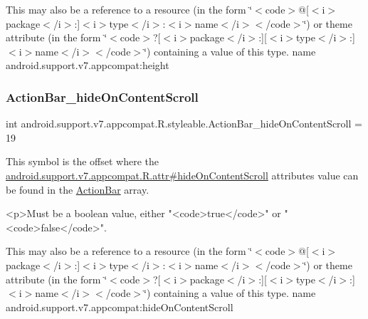 This may also be a reference to a resource (in the form \char`\"{}$<$code$>$@\mbox{[}$<$i$>$package$<$/i$>$\+:\mbox{]}$<$i$>$type$<$/i$>$\+:$<$i$>$name$<$/i$>$$<$/code$>$\char`\"{}) or theme attribute (in the form \char`\"{}$<$code$>$?\mbox{[}$<$i$>$package$<$/i$>$\+:\mbox{]}\mbox{[}$<$i$>$type$<$/i$>$\+:\mbox{]}$<$i$>$name$<$/i$>$$<$/code$>$\char`\"{}) containing a value of this type.  name android.\+support.\+v7.\+appcompat\+:height \mbox{\label{classandroid_1_1support_1_1v7_1_1appcompat_1_1R_1_1styleable_ac03598addae3e6fc7d42a661b99b2572}} 
\subsubsection{\texorpdfstring{Action\+Bar\+\_\+hide\+On\+Content\+Scroll}{ActionBar\_hideOnContentScroll}}
{\footnotesize\ttfamily int android.\+support.\+v7.\+appcompat.\+R.\+styleable.\+Action\+Bar\+\_\+hide\+On\+Content\+Scroll = 19\hspace{0.3cm}{\ttfamily [static]}}

This symbol is the offset where the \hyperlink{classandroid_1_1support_1_1v7_1_1appcompat_1_1R_1_1attr_acd8f7a0451e3e9f87d4b5637d3adcf2f}{android.\+support.\+v7.\+appcompat.\+R.\+attr\#hide\+On\+Content\+Scroll} attribute\textquotesingle{}s value can be found in the \hyperlink{classandroid_1_1support_1_1v7_1_1appcompat_1_1R_1_1styleable_a5941dc15714398e9ec9afaa0155cc1cf}{Action\+Bar} array.

\begin{DoxyVerb}      <p>Must be a boolean value, either "<code>true</code>" or "<code>false</code>".
\end{DoxyVerb}
 

This may also be a reference to a resource (in the form \char`\"{}$<$code$>$@\mbox{[}$<$i$>$package$<$/i$>$\+:\mbox{]}$<$i$>$type$<$/i$>$\+:$<$i$>$name$<$/i$>$$<$/code$>$\char`\"{}) or theme attribute (in the form \char`\"{}$<$code$>$?\mbox{[}$<$i$>$package$<$/i$>$\+:\mbox{]}\mbox{[}$<$i$>$type$<$/i$>$\+:\mbox{]}$<$i$>$name$<$/i$>$$<$/code$>$\char`\"{}) containing a value of this type.  name android.\+support.\+v7.\+appcompat\+:hide\+On\+Content\+Scroll \mbox{\label{classandroid_1_1support_1_1v7_1_1appcompat_1_1R_1_1styleable_a12cecc9d3d4baf3fc85b7acce8e59955}} 

